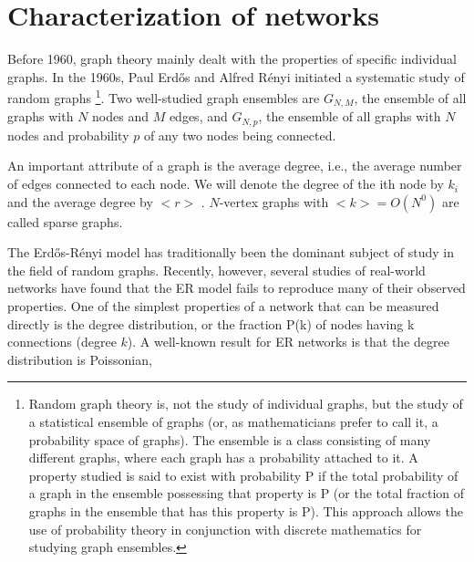 \documentclass[12pt]{article}
\newcommand{\s}{\vspace*{0.4cm}}
\newcommand{\nd}{\noindent}
\begin{document}


\clearpage
\section{Characterization of networks}

\nd Before 1960, graph theory mainly dealt with the properties of specific individual graphs. In the 1960s, Paul Erdős and Alfred Rényi initiated a systematic study of random graphs \footnote{Random graph theory is, not the
study of individual graphs, but the study of a statistical ensemble of graphs (or, as mathematicians prefer to call it, a probability space of graphs). The ensemble is a class consisting of many different graphs, where each graph has a probability attached to it. A property studied is said to exist with probability P if the total probability of a graph in the ensemble possessing that property is P (or the total fraction of graphs in the ensemble that has this property is P). This approach allows the use of probability theory in conjunction with discrete mathematics for studying graph
ensembles.}. Two well-studied graph ensembles are $G_{N,M}$, the ensemble of all graphs with $N$ nodes and $M$ edges, and $G_{N,p}$, the ensemble of all graphs with $N$ nodes and probability $p$ of any two nodes being connected. \s

\nd An important attribute of a graph is the average degree, i.e., the average number of edges connected to each node. We will denote the degree of the ith node by $k_i$ and the average degree by $ <r> $ . $N$-vertex graphs with $<k> = O(N^0)$ are called sparse graphs. \s

\nd The Erdős-Rényi model has traditionally been the dominant subject of study in the field of random graphs. Recently, however, several studies of real-world networks have found that the ER model fails to reproduce many of their observed properties. One of the simplest properties of a network that can be measured directly is the degree distribution, or the fraction P(k) of nodes having k connections (degree $k$). A well-known result for ER networks is that the degree distribution is Poissonian,
\end{document}
